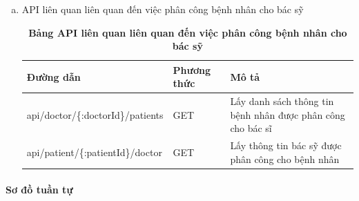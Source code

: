 \begin{enumerate}[a)]
\begin{table}[H]
\begin{tabularx}{0.9\textwidth}{
  | >{\raggedright\arraybackslash}X
  | >{\raggedright\arraybackslash}m{2cm}
  | >{\raggedright\arraybackslash}X|
  }
  \end{tabularx}
  \label{table_api_ecg}
\end{table}


\item API liên quan liên quan đến việc phân công bệnh nhân cho bác sỹ



\begin{table}[H]
  \centering
  \caption{\bfseries \fontsize{12pt}{0pt}\selectfont Bảng API liên quan liên quan đến việc phân công bệnh nhân cho bác sỹ}
  \begin{tabularx}{0.9\textwidth}{
  | >{\raggedright\arraybackslash}X
  | >{\raggedright\arraybackslash}m{2cm}
  | >{\raggedright\arraybackslash}X|
  }
  \hline
  \bfseries Đường dẫn    &\bfseries Phương thức    &\bfseries Mô tả\\ \hline
   api/doctor/\{:doctorId\}/patients   &   GET  & Lấy danh sách thông tin bệnh nhân được phân công cho bác sĩ \\ \hline
  api/patient/\{:patientId\}/doctor  &    GET    & Lấy thông tin bác sỹ được phân công cho bệnh nhân \\ \hline

  \end{tabularx}
  \label{table_api_pat_doc}
\end{table}



\end{enumerate}




\paragraph{Sơ đồ tuần tự}
\mbox{}

